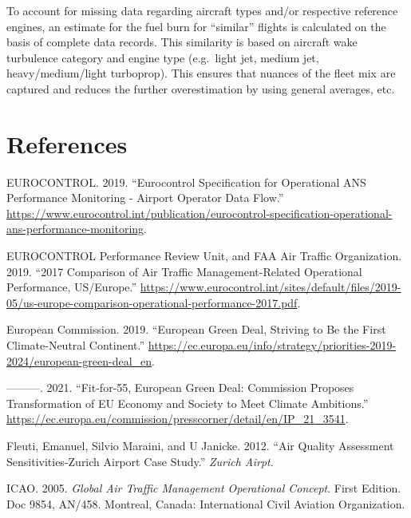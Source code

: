 \documentclass[
  a4paper,
  DIV=11,
  numbers=noendperiod]{scrreprt}
\newlength{\cslhangindent}
\newlength{\cslentryspacingunit} %
\newenvironment{CSLReferences}[2] %
 {%
  \setlength{\parindent}{0pt}
  \ifodd #1
  \let\oldpar\par
  \def\par{\hangindent=\cslhangindent\oldpar}
  \fi
  \setlength{\parskip}{#2\cslentryspacingunit}
 }%
 {}
\begin{document}
To account for missing data regarding aircraft types and/or respective
reference engines, an estimate for the fuel burn for ``similar'' flights
is calculated on the basis of complete data records. This similarity is
based on aircraft wake turbulence category and engine type (e.g.~light
jet, medium jet, heavy/medium/light turboprop). This ensures that
nuances of the fleet mix are captured and reduces the further
overestimation by using general averages, etc.

\hypertarget{references}{%
\chapter*{References}\label{references}}

\hypertarget{refs}{}
\begin{CSLReferences}{1}{0}
\leavevmode{}%
EUROCONTROL. 2019. {``Eurocontrol Specification for Operational ANS
Performance Monitoring - Airport Operator Data Flow.''}
\url{https://www.eurocontrol.int/publication/eurocontrol-specification-operational-ans-performance-monitoring}.

\leavevmode{}%
EUROCONTROL Performance Review Unit, and FAA Air Traffic Organization.
2019. {``2017 Comparison of Air Traffic Management-Related Operational
Performance, US/Europe.''}
\url{https://www.eurocontrol.int/sites/default/files/2019-05/us-europe-comparison-operational-performance-2017.pdf}.

\leavevmode{}%
European Commission. 2019. {``European Green Deal, Striving to Be the
First Climate-Neutral Continent.''}
\url{https://ec.europa.eu/info/strategy/priorities-2019-2024/european-green-deal_en}.

\leavevmode{}%
---------. 2021. {``Fit-for-55, European Green Deal: Commission Proposes
Transformation of EU Economy and Society to Meet Climate Ambitions.''}
\url{https://ec.europa.eu/commission/presscorner/detail/en/IP_21_3541}.

\leavevmode{}%
Fleuti, Emanuel, Silvio Maraini, and U Janicke. 2012. {``Air Quality
Assessment Sensitivities-Zurich Airport Case Study.''} \emph{Zurich
Airpt}.

\leavevmode{}%
ICAO. 2005. \emph{Global Air Traffic Management Operational Concept}.
First Edition. Doc 9854, AN/458. Montreal, Canada: International Civil
Aviation Organization.


\end{CSLReferences}
\end{document}
